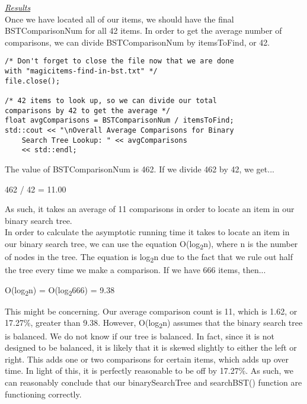 \documentclass{article}
\begin{document}
\underline{\textit{Results}} \\

Once we have located all of our items, we should have the final BSTComparisonNum for all 42 items. In order to get the average number of comparisons, we can divide BSTComparisonNum by itemsToFind, or 42.
\begin{lstlisting}
/* Don't forget to close the file now that we are done 
with "magicitems-find-in-bst.txt" */
file.close();

/* 42 items to look up, so we can divide our total 
comparisons by 42 to get the average */
float avgComparisons = BSTComparisonNum / itemsToFind;
std::cout << "\nOverall Average Comparisons for Binary 
    Search Tree Lookup: " << avgComparisons 
    << std::endl;
\end{lstlisting}
\pagebreak
The value of BSTComparisonNum is 462. If we divide 462 by 42, we get...
\begin{center}
    462 / 42 = 11.00
\end{center}
As such, it takes an average of 11 comparisons in order to locate an item in our binary search tree. \\
In order to calculate the asymptotic running time it takes to locate an item in our binary search tree, we can use the equation O(log\textsubscript{2}n), where n is the number of nodes in the tree. The equation is log\textsubscript{2}n due to the fact that we rule out half the tree every time we make a comparison. If we have 666 items, then...
\begin{center}
    O(log\textsubscript{2}n) = O(log\textsubscript{2}666) = 9.38
\end{center}
This might be concerning. Our average comparison count is 11, which is 1.62, or 17.27\%, greater than 9.38. However, O(log\textsubscript{2}n) assumes that the binary search tree is balanced. We do not know if our tree is balanced. In fact, since it is not designed to be balanced, it is likely that it is skewed slightly to either the left or right. This adds one or two comparisons for certain items, which adds up over time. In light of this, it is perfectly reasonable to be off by 17.27\%. As such, we can reasonably conclude that our binarySearchTree and searchBST() function are functioning correctly.
\end{document}
